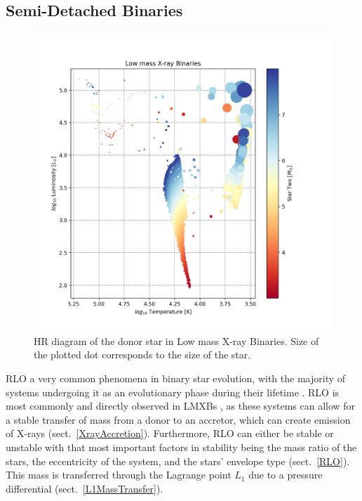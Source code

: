\documentclass[12pt, a4paper]{article}
\begin{document}
    \subsection{Semi-Detached Binaries} \label{sec:SemiDetachedResults}
        \begin{figure}[H]
            \centering
            \includegraphics[scale = .6]{figs/GeneratedFigs/V404_Cygni/LMXBsHRDiagram.png}
            \caption{HR diagram of the donor star in Low mass X-ray Binaries. Size of the plotted dot corresponds to the size of the star.}
            \label{XrayBinaryHRDiagram}
        \end{figure}
       RLO a very common phenomena in binary star evolution, with the majority of systems undergoing it as an evolutionary phase during their lifetime \parencite{TaurisvandenHeuvel+2023}. RLO is most commonly and directly observed in LMXBs \parencite{TaurisvandenHeuvel+2023}, as these systems can allow for a stable transfer of mass from a donor to an accretor, which can create emission of X-rays \parencite{TaurisvandenHeuvel+2023} (sect.~\ref{XrayAccretion}). Furthermore, RLO can either be stable or unstable with that most important factors in stability being the mass ratio of the stars, the eccentricity of the system, and the stars' envelope type (sect.~\ref{RLO}). This mass is transferred through the Lagrange point $L_1$ due to a pressure differential \parencite{TaurisvandenHeuvel+2023} (sect.~\ref{L1MassTransfer}). 
\end{document}
